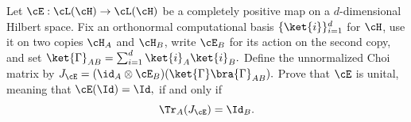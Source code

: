 Let $\cE:\cL(\cH)\to\cL(\cH)$ be a completely positive map on a
$d$-dimensional Hilbert space. Fix an orthonormal computational basis
$\{\ket{i}\}_{i=1}^d$ for $\cH$, use it on two copies $\cH_A$ and $\cH_B$, write $\cE_B$ for its action on the second copy, and set $\ket{\Gamma}_{AB}=\sum_{i=1}^{d}\ket{i}_A\ket{i}_B.$ Define the unnormalized Choi matrix by $J_{\cE}=(\id_A\otimes\cE_B)(\ket{\Gamma}\bra{\Gamma}_{AB}).$ Prove that $\cE$ is unital, meaning that $\cE(\Id)=\Id,$ if and only if
$$
\Tr_A(J_{\cE})=\Id_B.
$$
